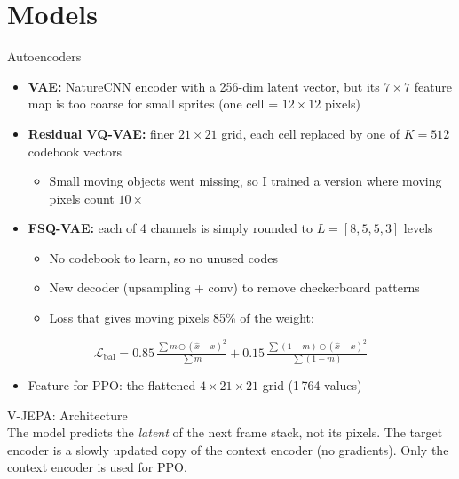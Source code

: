 \documentclass[aspectratio=43,10pt]{beamer}
\begin{document}
\section{Models}

\begin{frame}{Autoencoders}
  \begin{itemize}\setlength\itemsep{0.5em}
    \item \textbf{VAE:} NatureCNN encoder with a 256-dim latent vector, but its $7\times7$
          feature map is too coarse for small sprites (one cell = $12\times12$ pixels)
    \item \textbf{Residual VQ-VAE:} finer $21\times21$ grid, each cell replaced by one of
          $K=512$ codebook vectors
      \begin{itemize}
        \item Small moving objects went missing, so I trained a version where moving pixels
              count $10\times$
      \end{itemize}
    \item \textbf{FSQ-VAE:} each of 4 channels is simply rounded to $L=[8,5,5,3]$ levels
      \begin{itemize}
        \item No codebook to learn, so no unused codes
        \item New decoder (upsampling + conv) to remove checkerboard patterns
        \item Loss that gives moving pixels 85\% of the weight:
      \end{itemize}
  \end{itemize}
  \[
    \mathcal{L}_{\text{bal}} = 0.85\,\tfrac{\sum m\odot(\hat x-x)^2}{\sum m}
    +0.15\,\tfrac{\sum (1-m)\odot(\hat x-x)^2}{\sum (1-m)}
  \]
  \begin{itemize}
    \item Feature for PPO: the flattened $4\times21\times21$ grid (1\,764 values)
  \end{itemize}
\end{frame}

\begin{frame}{V-JEPA: Architecture}
  \centering
  \resizebox{\textwidth}{!}{}\\[0.4em]
  {\footnotesize The model predicts the \emph{latent} of the next frame stack, not its pixels.
  The target encoder is a slowly updated copy of the context encoder (no gradients).
  Only the context encoder is used for PPO.}
\end{frame}
\end{document}
